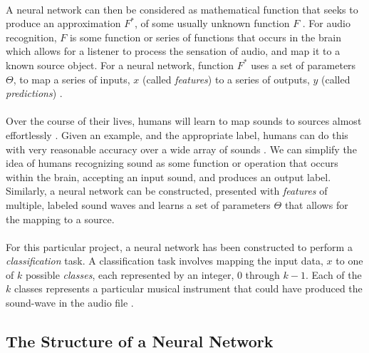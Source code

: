 \documentclass[12pt,letterpaper]{article}
\begin{document}
\paragraph*{}A neural network can then be considered as mathematical function that seeks to produce an approximation $F^*$, of some usually unknown function $F$ . For audio recognition, $F$ is some function or series of functions that occurs in the brain which allows for a listener to process the sensation of audio, and map it to a known source object. For a neural network, function $F^*$ uses a set of parameters $\Theta$, to map a series of inputs, $x$ (called \textit{features}) to a series of outputs, $y$ (called \textit{predictions}) \cite{Goodfellow,James,Virtanen}. 

\paragraph*{}Over the course of their lives, humans will learn to map sounds to sources almost effortlessly \cite{Virtanen}. Given an example, and the appropriate label, humans can do this with very reasonable accuracy over a wide array of sounds \cite{Olsen,White}. We can simplify the idea of humans recognizing sound as some function or operation that occurs within the brain, accepting an input sound, and produces an output label. Similarly, a neural network can be constructed, presented with \textit{features} of multiple, labeled sound waves and learns a set of parameters $\Theta$ that allows for the mapping to a source.

\paragraph*{}For this particular project, a neural network has been constructed to perform a \textit{classification} task. A classification task involves mapping the input data, $x$ to one of $k$ possible \textit{classes}, each represented by an integer, $0$ through $k-1$. Each of the $k$ classes represents a particular musical instrument that could have produced the sound-wave in the audio file \cite{Goodfellow,Loy,Virtanen}. 


\subsection{The Structure of a Neural Network}
\label{subsec-NetworkStructure}
\end{document}
